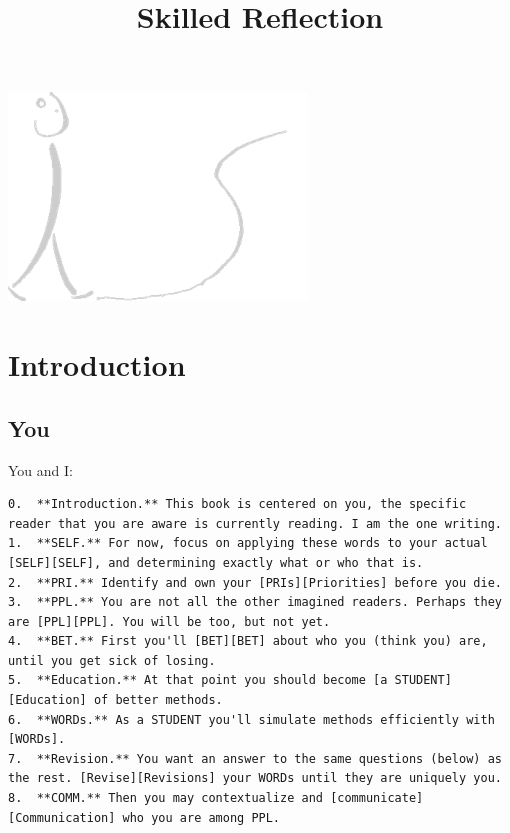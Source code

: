\documentclass[
]{book}
\title{Skilled Reflection}
\author{}
\date{\vspace{-2.5em}}
\begin{document}
\maketitle

{
\setcounter{tocdepth}{1}
\tableofcontents
}
\begin{center}\includegraphics{figs/sr_gray_transp} \end{center}

\hypertarget{introduction}{%
\chapter*{Introduction}\label{introduction}}

\hypertarget{you}{%
\section{You}\label{you}}

You and I:

\begin{verbatim}
0.  **Introduction.** This book is centered on you, the specific reader that you are aware is currently reading. I am the one writing.
1.  **SELF.** For now, focus on applying these words to your actual [SELF][SELF], and determining exactly what or who that is.
2.  **PRI.** Identify and own your [PRIs][Priorities] before you die.
3.  **PPL.** You are not all the other imagined readers. Perhaps they are [PPL][PPL]. You will be too, but not yet.
4.  **BET.** First you'll [BET][BET] about who you (think you) are, until you get sick of losing.
5.  **Education.** At that point you should become [a STUDENT][Education] of better methods.
6.  **WORDs.** As a STUDENT you'll simulate methods efficiently with [WORDs].
7.  **Revision.** You want an answer to the same questions (below) as the rest. [Revise][Revisions] your WORDs until they are uniquely you.
8.  **COMM.** Then you may contextualize and [communicate][Communication] who you are among PPL.  
\end{verbatim}
\end{document}
